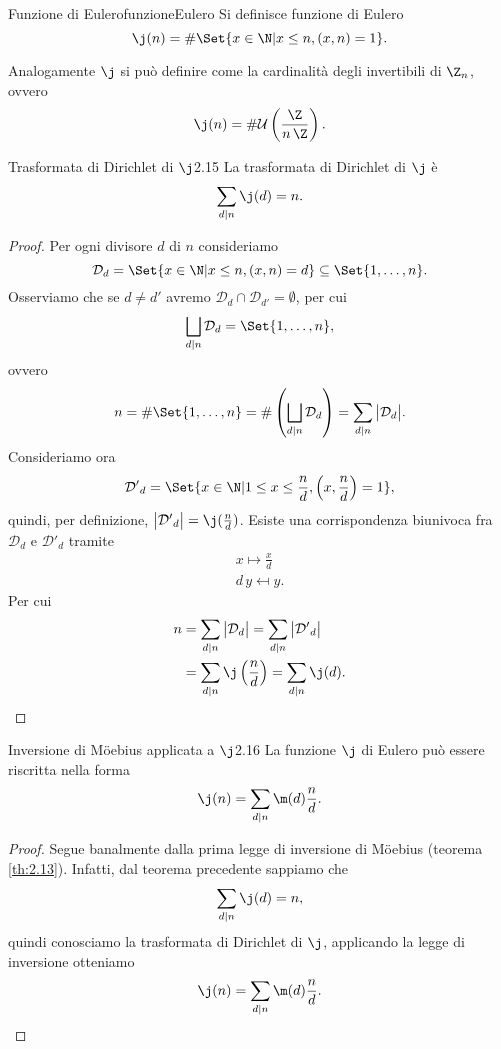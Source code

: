 \begin{defn}{Funzione di Eulero}{funzioneEulero}
	Si definisce funzione di Eulero
	\[
		\j(n)=\#\Set{x\in\N | x\le n,(x,n)=1}.
	\]
\end{defn}

\begin{oss}
	Analogamente \(\j\) si può definire come la cardinalità degli invertibili di \(\Z_n\), ovvero
	\[
		\j(n)=\#\mathcal{U}\left( \frac{\Z}{n\,\Z} \right).
	\]
\end{oss}

\begin{teor}{Trasformata di Dirichlet di \(\j\)}{2.15}
	La trasformata di Dirichlet di \(\j\) è
	\[
		\sum_{d\mid n}\j(d)=n.
	\]
\end{teor}

\begin{proof}
	Per ogni divisore \(d\) di \(n\) consideriamo
	\[
		\mathcal{D}_d=\Set{x\in\N | x\le n,(x,n)=d}\subseteq\Set{1,\ldots,n}.
	\]
	Osserviamo che se \(d\neq d'\) avremo \(\mathcal{D}_d\cap\mathcal{D}_{d'}=\emptyset\), per cui
	\[
		\bigsqcup_{d\mid n}\mathcal{D}_d=\Set{1,\ldots,n},
	\]
	ovvero
	\[
		n=\#\Set{1,\ldots,n}=\#\left( \bigsqcup_{d\mid n}\mathcal{D}_d \right)=\sum_{d\mid n}\big\lvert\mathcal{D}_d\big\rvert.
	\]
	Consideriamo ora
	\[
		\mathcal{D'}_d=\Set{x\in\N | 1\le x\le \frac{n}{d},\left( x,\frac{n}{d} \right)=1},
	\]
	quindi, per definizione, \(\big\lvert\mathcal{D'}_d\big\rvert=\j(\frac{n}{d})\).
	Esiste una corrispondenza biunivoca fra \(\mathcal{D}_d\) e \(\mathcal{D'}_d\) tramite
	\begin{gather*}
		x\mapsto \frac{x}{d}\\
		d\,y\mapsfrom y.
	\end{gather*}
	Per cui
	\[
		\begin{split}
			n & =\sum_{d\mid n}\big\lvert\mathcal{D}_d\big\rvert=\sum_{d\mid n}\big\lvert\mathcal{D'}_d\big\rvert\\
			& =\sum_{d\mid n}\j \left( \frac{n}{d} \right)=\sum_{d\mid n}\j(d).\qedhere
		\end{split}
	\]
\end{proof}

\begin{teor}{Inversione di M\"oebius applicata a \(\j\)}{2.16}
	La funzione \(\j\) di Eulero può essere riscritta nella forma
	\[
		\j(n)=\sum_{d\mid n}\m(d)\frac{n}{d}.
	\]
\end{teor}

\begin{proof}
	Segue banalmente dalla prima legge di inversione di M\"oebius (teorema \ref{th:2.13}).
	Infatti, dal teorema precedente sappiamo che
	\[
		\sum_{d\mid n}\j(d)=n,
	\]
	quindi conosciamo la trasformata di Dirichlet di \(\j\), applicando la legge di inversione otteniamo
	\[
		\j(n)=\sum_{d\mid n}\m(d)\frac{n}{d}.\qedhere
	\]
\end{proof}

